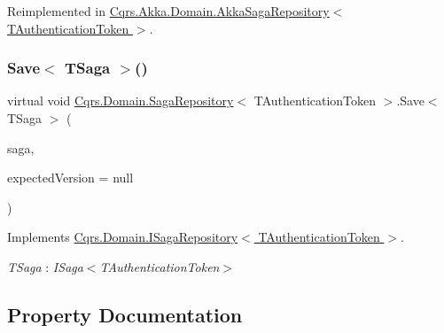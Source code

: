 Reimplemented in \hyperlink{classCqrs_1_1Akka_1_1Domain_1_1AkkaSagaRepository_a7f6375bb99e680792466fb420232a535_a7f6375bb99e680792466fb420232a535}{Cqrs.\+Akka.\+Domain.\+Akka\+Saga\+Repository$<$ T\+Authentication\+Token $>$}.

\mbox{\label{classCqrs_1_1Domain_1_1SagaRepository_a84cae424cb01de22864ae7d960007cd0_a84cae424cb01de22864ae7d960007cd0}} 
\subsubsection{\texorpdfstring{Save$<$ T\+Saga $>$()}{Save< TSaga >()}}
{\footnotesize\ttfamily virtual void \hyperlink{classCqrs_1_1Domain_1_1SagaRepository}{Cqrs.\+Domain.\+Saga\+Repository}$<$ T\+Authentication\+Token $>$.Save$<$ T\+Saga $>$ (\begin{DoxyParamCaption}\item[{T\+Saga}]{saga,  }\item[{int?}]{expected\+Version = {\ttfamily null} }\end{DoxyParamCaption})\hspace{0.3cm}{\ttfamily [virtual]}}



Implements \hyperlink{interfaceCqrs_1_1Domain_1_1ISagaRepository_ad539cdc70f3168d0335c9510742e25cd_ad539cdc70f3168d0335c9510742e25cd}{Cqrs.\+Domain.\+I\+Saga\+Repository$<$ T\+Authentication\+Token $>$}.

\begin{Desc}
\item[Type Constraints]\begin{description}
\item[{\em T\+Saga} : {\em I\+Saga$<$T\+Authentication\+Token$>$}]\end{description}
\end{Desc}


\subsection{Property Documentation}
\mbox{\label{classCqrs_1_1Domain_1_1SagaRepository_a654f9f7c2130864d63515f1504a750fd_a654f9f7c2130864d63515f1504a750fd}} 
